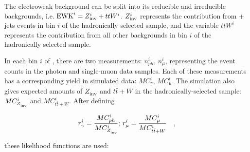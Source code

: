 The electroweak background can be split into its reducible and 
irreducible backgrounds, i.e. $\mathrm{EWK}^i =  Z_{\rm inv}^{i} + ttW^{i}$.
$Z_{\rm inv}^{i}$ represents the contribution from \znunu + jets
events in \HT bin $i$ of the hadronically selected sample, 
and the variable $ttW^{i}$ represents the contribution from 
all other backgrounds in \HT bin $i$ of the hadronically 
selected sample.  
%
%
%

In each bin $i$ of \HT, there are two measurements: $n_{ph}^i$,
$n_{\mu}^i$, representing the event counts in the photon and single-muon data samples.  
Each of these measurements has a corresponding yield in simulated 
data: $MC_{\gamma}^i$, $MC_{\mu}^i$.  The simulation also 
gives expected amounts of $Z_{\rm inv}^{}$ and $t\bar{t}+W$ in 
the hadronically-selected sample: $MC_{Z_{\rm inv}^{}}^i$ and 
$MC_{t\bar{t}+W}^i$.  After defining

\begin{equation}
r_{\gamma}^i = \frac{MC_{ph}^i}{MC_{Z_{\rm inv}^{}}^i};\, r_{\mu}^i =
\frac{MC_{\mu}^i}{MC_{t\bar{t}+W}^i}\quad ,
\end{equation}

these likelihood functions are used:

